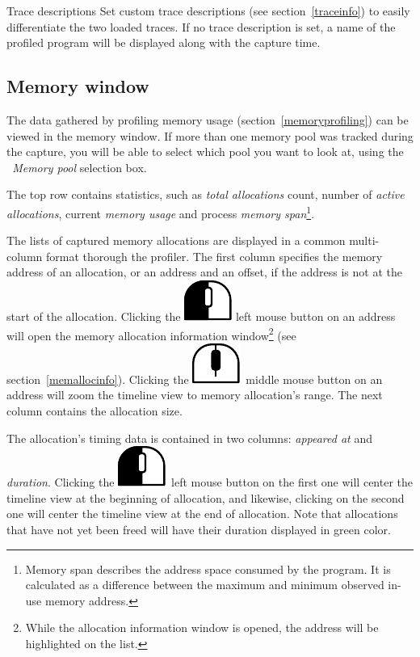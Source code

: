 \documentclass[hidelinks,titlepage,a4paper]{article}
\newcommand{\LMB}{\includegraphics[height=.8\baselineskip]{icons/lmb}}
\newcommand{\MMB}{\includegraphics[height=.8\baselineskip]{icons/mmb}}
\begin{document}
\begin{bclogo}[
noborder=true,
couleur=black!5,
logo=\bclampe
]{Trace descriptions}
Set custom trace descriptions (see section~\ref{traceinfo}) to easily differentiate the two loaded traces. If no trace description is set, a name of the profiled program will be displayed along with the capture time.
\end{bclogo}

\subsection{Memory window}
\label{memorywindow}

The data gathered by profiling memory usage (section~\ref{memoryprofiling}) can be viewed in the memory window. If more than one memory pool was tracked during the capture, you will be able to select which pool you want to look at, using the \emph{\faArchive{}~Memory pool} selection box.

The top row contains statistics, such as \emph{total allocations} count, number of \emph{active allocations}, current \emph{memory usage} and process \emph{memory span}\footnote{Memory span describes the address space consumed by the program. It is calculated as a difference between the maximum and minimum observed in-use memory address.}.

The lists of captured memory allocations are displayed in a common multi-column format thorough the profiler. The first column specifies the memory address of an allocation, or an address and an offset, if the address is not at the start of the allocation. Clicking the \LMB{} left mouse button on an address will open the memory allocation information window\footnote{While the allocation information window is opened, the address will be highlighted on the list.} (see section~\ref{memallocinfo}). Clicking the \MMB{}~middle mouse button on an address will zoom the timeline view to memory allocation's range. The next column contains the allocation size.

The allocation's timing data is contained in two columns: \emph{appeared at} and \emph{duration}. Clicking the \LMB{}~left mouse button on the first one will center the timeline view at the beginning of allocation, and likewise, clicking on the second one will center the timeline view at the end of allocation. Note that allocations that have not yet been freed will have their duration displayed in green color.
\end{document}
